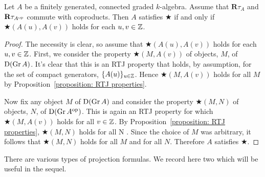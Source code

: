 \begin{proposition} \label{proposition: big star condition}
  Let \(A\) be a finitely generated, connected graded \(k\)-algebra.
  Assume that \(\mathbf{R}\tau_A\) and \(\mathbf{R}\tau_{A^{\operatorname{op}}}\) commute with coproducts. Then \(A\) satisfies \(\bigstar\) if and only if \(\bigstar( A(u), A(v) )\) holds for each \(u,v \in \mathbb{Z}\).
\end{proposition}

\begin{proof}
  The necessity is clear, so assume that \(\bigstar(A(u), A(v))\) holds for each \(u,v \in \mathbb{Z}\).
  First, we consider the property \(\bigstar(M, A(v))\) of objects, \(M\), of \(\mathrm{D}(\operatorname{Gr}A)\).
  It's clear that this is an RTJ property that holds, by assumption, for the set of compact generators, \(\{A(u)\}_{u \in \mathbb{Z}}\).
  Hence \(\bigstar(M,A(v))\) holds for all \(M\) by Proposition~\ref{proposition: RTJ properties}.

  Now fix any object \(M\) of \(\mathrm{D}(\operatorname{Gr}A)\) and consider the property \(\bigstar(M, N)\) of objects, \(N\), of \(\mathrm{D}(\operatorname{Gr}A^{\operatorname{op}})\).
  This is again an RTJ property for which \(\bigstar(M,A(v))\) holds for all \(v \in \mathbb{Z}\).
  By Proposition~\ref{proposition: RTJ properties}, \(\bigstar(M,N)\) holds for all N .
  Since the choice of \(M\) was arbitrary, it follows that \(\bigstar(M,N)\) holds for all \(M\) and for all \(N\).
  Therefore \(A\) satisfies \(\bigstar\).
\end{proof}

There are various types of projection formulas.
We record here two which will be useful in the sequel.

